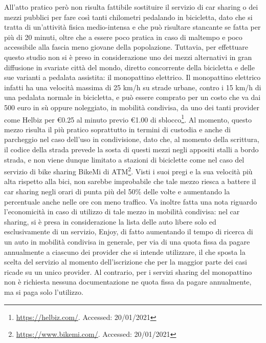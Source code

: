 All'atto pratico però non risulta fattibile sostituire il servizio di car sharing o dei mezzi pubblici per fare così tanti chilometri pedalando in bicicletta, dato che si tratta di un'attività fisica medio-intensa e che può risultare stancante se fatta per più di 20 minuti, oltre che a essere poco pratica in caso di maltempo e poco accessibile alla fascia meno giovane della popolazione. Tuttavia, per effettuare questo studio non si è preso in considerazione uno dei mezzi alternativi in gran diffusione in svariate città del mondo, diretto concorrente della bicicletta e delle sue varianti a pedalata assistita: il monopattino elettrico. Il monopattino elettrico infatti ha una velocità massima di 25 km/h su strade urbane, contro i 15 km/h di una pedalata normale in bicicletta, e può essere comprato per un costo che va dai 500 euro in sù oppure noleggiato, in mobilità condivisa, da uno dei tanti provider come Helbiz per €0.25 al minuto previo €1.00 di sblocco\footnote{\url{https://helbiz.com/}. Accessed: 20/01/2021}. Al momento, questo mezzo risulta il più pratico soprattutto in termini di custodia e anche di parcheggio nel caso dell'uso in condivisione, dato che, al momento della scrittura, il codice della strada prevede la sosta di questi mezzi negli appositi stalli a bordo strada, e non viene dunque limitato a stazioni di biciclette come nel caso del servizio di bike sharing BikeMi di ATM\footnote{\url{https://www.bikemi.com/}. Accessed: 20/01/2021}. Visti i suoi pregi e la sua velocità più alta rispetto alla bici, non sarebbe improbabile che tale mezzo riesca a battere il car sharing negli orari di punta più del 50\% delle volte e aumentando la percentuale anche nelle ore con meno traffico. Va inoltre fatta una nota riguardo l'economicità in caso di utilizzo di tale mezzo in mobilità condivisa: nel car sharing, si è presa in considerazione la lista delle auto libere solo ed esclusivamente di un servizio, Enjoy, di fatto aumentando il tempo di ricerca di un auto in mobilità condivisa in generale, per via di una quota fissa da pagare annualmente a ciascuno dei provider che si intende utilizzare, il che sposta la scelta del servizio al momento dell'iscrizione che per la maggior parte dei casi ricade su un unico provider. Al contrario, per i servizi sharing del monopattino non è richiesta nessuna documentazione ne quota fissa da pagare annualmente, ma si paga solo l'utilizzo.

